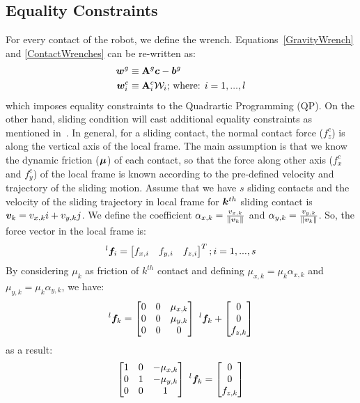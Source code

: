 \documentclass[letterpaper, 10pt, conference]{ieeeconf}
\begin{document}
 \subsection{Equality Constraints} \label{EqualityConstraintsSubsection}
 For every contact of the robot, we define the wrench. Equations~\eqref{GravityWrench} and \eqref{ContactWrenches} can be re-written as:
 \begin{align}
 \bfw^g &\equiv \bfA^g \bfc - \bfb^g \label{EqualityMass}\\
 \bfw_{i}^c &\equiv \bfA_{i}^c \mathbf{\calW}_i \text{;  where: } i=1,...,l \label{EqualityContacts}
 \end{align}
 which imposes equality constraints to the Quadrartic Programming (QP). On the other hand, sliding condition will cast additional equality constraints as mentioned in~\cite{Samadi2019HAL}. In general, for a sliding contact, the normal contact force ($f_z^c$) is along the vertical axis of the local frame. The main assumption is that we know the dynamic friction ($\boldsymbol{\mu}$) of each contact, so that the force along other axis ($f_x^c$ and $f_y^c$) of the local frame is known according to the pre-defined velocity and trajectory of the sliding motion. Assume that we have $s$ sliding contacts and the velocity of the sliding trajectory in local frame for $\bm{k}^{th}$ sliding contact is $\bm{v}_k = v_{x,k}i + v_{y,k}j$. We define the coefficient $\alpha_{x,k} = \frac{v_{x,k}}{\left\lVert\bm{v}_k\right\rVert}$ and $\alpha_{y,k} = \frac{v_{y,k}}{\left\lVert\bm{v}_k\right\rVert}$. So, the force vector in the local frame is:
 \begin{equation}
 ^l\bm{f}_i = \begin{bmatrix}
 f_{x,i} & f_{y,i} & f_{z,i}
 \end{bmatrix}^T ; i = 1,...,s
 \end{equation}
 By considering $\mu_{k}$ as friction of $k^{th}$ contact and defining $\mu_{x,k} = \mu_k\alpha_{x,k}$ and $\mu_{y,k} = \mu_k\alpha_{y,k}$, we have:
 \begin{equation}
 ^l\bm{f}_k = \begin{bmatrix}
 0&0&\mu_{x,k} \\
 0&0&\mu_{y,k} \\
 0&0&0
 \end{bmatrix} \ ^l\bm{f}_k + 
 \begin{bmatrix}
 0 \\
 0 \\
 f_{z,k}
 \end{bmatrix}
 \end{equation}
as a result:
 \begin{equation}
 \begin{bmatrix}
 1&0&-\mu_{x,k} \\
 0&1&-\mu_{y,k} \\
 0&0&1
 \end{bmatrix} \ ^l\bm{f}_k = 
 \begin{bmatrix}
 0 \\
 0 \\
 f_{z,k}
 \end{bmatrix}
 \end{equation}
\end{document}
